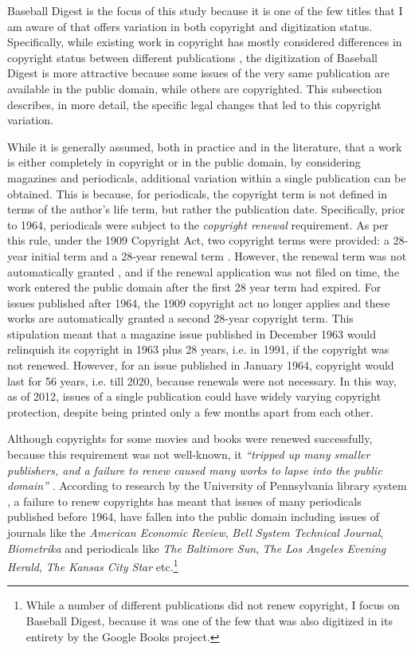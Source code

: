 \documentclass[11pt]{article}
\begin{document}
Baseball Digest is the focus of this study because it is one of the few titles that I am aware of that offers variation in both copyright and digitization status. Specifically, while existing work in copyright has mostly considered differences in copyright status between different publications \citep{reimers_effects_2013, heald_how_2013}, the digitization of Baseball Digest is more attractive because some issues of the very same publication are available in the public domain, while others are copyrighted. This subsection describes, in more detail, the specific legal changes that led to this copyright variation. 

While it is generally assumed, both in practice and in the literature, that a work is either completely in copyright or in the public domain, by considering magazines and periodicals, additional variation within a single publication can be obtained. This is because, for periodicals, the copyright term is not defined in terms of the author's life term, but rather the publication date. Specifically, prior to 1964, periodicals were subject to the \emph{copyright renewal} requirement. As per this rule, under the 1909 Copyright Act, two copyright terms were provided:  a 28-year initial term and a 28-year renewal term \citep{landes_indefinitely_2002-1}. However, the renewal term was not automatically granted \citep{kupferman_renewal_1944}, and if the renewal application was not filed on time, the work entered the public domain after the first 28 year term had expired. For issues published after 1964, the 1909 copyright act no longer applies and these works are automatically granted a second 28-year copyright term. This stipulation meant that a magazine issue published in December 1963 would relinquish its copyright in 1963 plus 28 years, i.e. in 1991, if the copyright was not renewed. However, for an issue published in January 1964, copyright would last for 56 years, i.e. till 2020, because renewals were not necessary. In this way, as of 2012, issues of a single publication could have widely varying copyright protection, despite being printed only a few months apart from each other. 

Although copyrights for some movies and books were renewed successfully, because this requirement was not well-known, it \emph{``tripped up many smaller publishers, and a failure to renew caused many works to lapse into the public domain''} \citep{andrade_copyright_2014}.  According to research by the University of Pennsylvania library system \citep{mark_ockerbloom_next_2006}, a failure to renew copyrights has meant that issues of many periodicals published before 1964, have fallen into the public domain including issues of journals like the \emph{American Economic Review}, \emph{Bell System Technical Journal}, \emph{Biometrika} and periodicals like \emph{The Baltimore Sun}, \emph{The Los Angeles Evening Herald}, \emph{The Kansas City Star} etc.\footnote{While a number of different publications did not renew copyright, I focus on Baseball Digest, because it was one of the few that was also digitized in its entirety by the Google Books project.}
\end{document}

